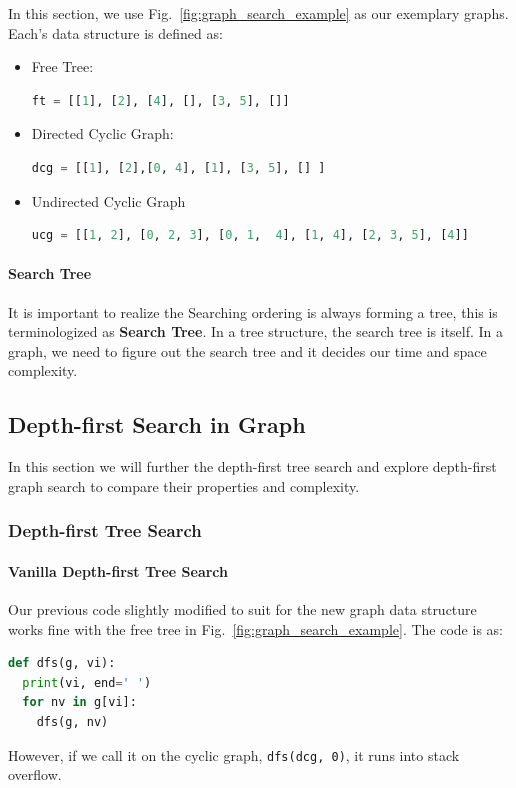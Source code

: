 \documentclass[../main.tex]{subfiles}
\begin{document}
In this section, we use Fig.~\ref{fig:graph_search_example} as our exemplary graphs. Each's data structure is defined as:
\begin{itemize}
\item Free Tree:
\begin{lstlisting}[language=Python]
ft = [[1], [2], [4], [], [3, 5], []]
\end{lstlisting}
    \item Directed Cyclic Graph:
    \begin{lstlisting}[language=Python]
dcg = [[1], [2],[0, 4], [1], [3, 5], [] ]
\end{lstlisting}
\item Undirected Cyclic Graph
    \begin{lstlisting}[language=Python]
ucg = [[1, 2], [0, 2, 3], [0, 1,  4], [1, 4], [2, 3, 5], [4]]
\end{lstlisting}
\end{itemize}


\paragraph{Search Tree} It is important to realize the Searching ordering is always forming a tree, this is terminologized as \textbf{Search Tree}. In a tree structure, the search tree is itself. In a graph, we need to figure out the search tree and it decides our time and space complexity. 


 
\subsection{Depth-first Search in Graph}
In this section we will further the depth-first tree search and explore depth-first graph search to compare their properties and complexity.  
\subsubsection{Depth-first Tree Search} 

\paragraph{Vanilla Depth-first Tree Search} Our previous code slightly modified to suit for the new graph data structure works fine with the free tree in Fig.~\ref{fig:graph_search_example}. The code is as:
\begin{lstlisting}[language=Python]
def dfs(g, vi):
  print(vi, end=' ')
  for nv in g[vi]:   
    dfs(g, nv)
\end{lstlisting}
However, if we call it on the cyclic graph, \texttt{dfs(dcg, 0)}, it runs into stack overflow.
\end{document}
